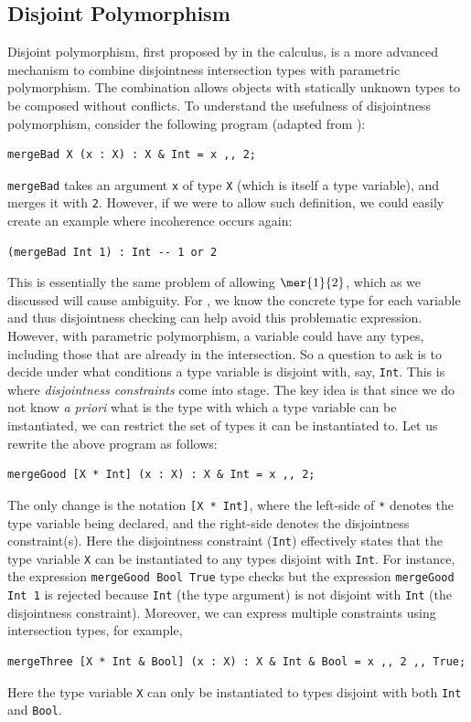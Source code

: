 \subsection{Disjoint Polymorphism}
\label{bg:sec:disjoint_poly}


Disjoint polymorphism, first proposed by \citet{alpuimdisjoint} in the \fname
calculus, is a more advanced mechanism to combine disjointness intersection
types with parametric polymorphism. The combination allows objects with
statically unknown types to be composed without conflicts. To understand the
usefulness of disjointness polymorphism, consider the following program (adapted
from \citet{alpuimdisjoint}):
\begin{lstlisting}
mergeBad X (x : X) : X & Int = x ,, 2;
\end{lstlisting}
\lstinline{mergeBad} takes an argument \lstinline{x} of type \lstinline{X} (which is itself a type variable), and merges it with \lstinline{2}.
However, if we were to allow such definition, we could easily create an example where incoherence occurs again:
\begin{lstlisting}
(mergeBad Int 1) : Int -- 1 or 2
\end{lstlisting}
This is essentially the same problem of allowing $\mer{1}{2}$, which as we
discussed will cause ambiguity. For \oname, we
know the concrete type for each variable and thus disjointness checking can help
avoid this problematic expression. However, with parametric polymorphism, a
variable could have any types,
including those that are already in the intersection. So a question to ask is to
decide under what conditions a type variable is disjoint with, say,
\lstinline{Int}. This is where \emph{disjointness constraints} come into stage. The key
idea is that since we do not know \emph{a priori} what is the type with which
a type variable can be instantiated, we can restrict the set of types it can be
instantiated to. Let us rewrite the above program as follows:
\begin{lstlisting}
mergeGood [X * Int] (x : X) : X & Int = x ,, 2;
\end{lstlisting}
The only change is the notation \lstinline{[X * Int]}, where the left-side of
\lstinline{*} denotes the type variable being declared, and the right-side
denotes the disjointness constraint(s). Here the disjointness constraint
(\lstinline{Int}) effectively states that the type variable \lstinline{X} can be
instantiated to any types disjoint with \lstinline{Int}. For instance, the expression \lstinline{mergeGood Bool True}
type checks but the expression \lstinline{mergeGood Int 1}
is rejected because \lstinline{Int} (the type argument) is not disjoint with
\lstinline{Int} (the disjointness constraint). Moreover, we can express multiple
constraints using intersection types, for example,
\begin{lstlisting}
mergeThree [X * Int & Bool] (x : X) : X & Int & Bool = x ,, 2 ,, True;
\end{lstlisting}
Here the type variable \lstinline{X} can only be instantiated to types disjoint with both
\lstinline{Int} and \lstinline{Bool}.


